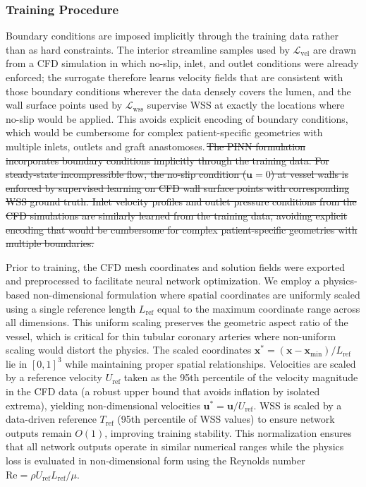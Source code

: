 ﻿\documentclass[12pt,a4paper]{article}
\newcommand{\added}[2][]{\begingroup\color{red}#2\endgroup}
\newcommand{\deleted}[2][]{\begingroup\color{red}\sout{#2}\endgroup}
\newcommand{\replaced}[3][]{\added{#2}\,\deleted{#3}}
\theoremstyle{definition}
\numberwithin{equation}{section}
\begin{document}
{{\subsubsection{Training Procedure}}
\replaced[id=pinn]{Boundary conditions are imposed implicitly through the training data rather than as hard constraints. The interior streamline samples used by $\mathcal{L}_{\text{vel}}$ are drawn from a CFD simulation in which no-slip, inlet, and outlet conditions were already enforced; the surrogate therefore learns velocity fields that are consistent with those boundary conditions wherever the data densely covers the lumen, and the wall surface points used by $\mathcal{L}_{\text{wss}}$ supervise WSS at exactly the locations where no-slip would be applied. This avoids explicit encoding of boundary conditions, which would be cumbersome for complex patient-specific geometries with multiple inlets, outlets and graft anastomoses.}{The PINN formulation incorporates boundary conditions implicitly through the training data. For steady-state incompressible flow, the no-slip condition ($\mathbf{u} = 0$) at vessel walls is enforced by supervised learning on CFD wall surface points with corresponding WSS ground truth. Inlet velocity profiles and outlet pressure conditions from the CFD simulations are similarly learned from the training data, avoiding explicit encoding that would be cumbersome for complex patient-specific geometries with multiple boundaries.}

Prior to training, the CFD mesh coordinates and solution fields were exported and preprocessed to facilitate neural network optimization. {We employ a physics-based non-dimensional formulation where spatial coordinates are uniformly scaled using a single reference length $L_{\text{ref}}$ equal to the maximum coordinate range across all dimensions. This uniform scaling preserves the geometric aspect ratio of the vessel, which is critical for thin tubular coronary arteries where non-uniform scaling would distort the physics. The scaled coordinates $\mathbf{x}^* = (\mathbf{x} - \mathbf{x}_{\text{min}}) / L_{\text{ref}}$ lie in $[0, 1]^3$ while maintaining proper spatial relationships. Velocities are scaled by a reference velocity $U_{\text{ref}}$ taken as the 95th percentile of the velocity magnitude in the CFD data (a robust upper bound that avoids inflation by isolated extrema), yielding non-dimensional velocities $\mathbf{u}^* = \mathbf{u} / U_{\text{ref}}$. WSS is scaled by a data-driven reference $T_{\text{ref}}$ (95th percentile of WSS values) to ensure network outputs remain $O(1)$, improving training stability.} This normalization ensures that all network outputs operate in similar numerical ranges while the physics loss is evaluated in non-dimensional form using the Reynolds number $\text{Re} = \rho U_{\text{ref}} L_{\text{ref}} / \mu$.

}
\end{document}

